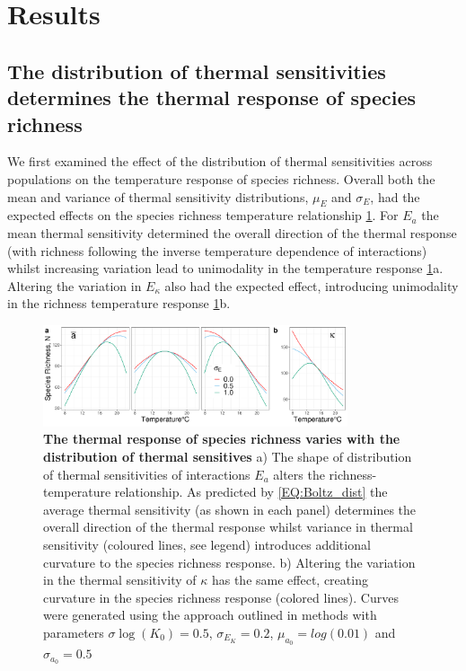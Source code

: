 \documentclass{article}
\begin{document}
\section*{Results}

\subsection*{The distribution of thermal sensitivities determines the thermal response of species richness}

We first examined the effect of the distribution of thermal sensitivities across populations on the temperature response of species richness. Overall both the mean and variance of thermal sensitivity distributions, $\mu_E$ and $\sigma_E$, had the expected effects on the species richness temperature relationship \cref{Fig:N_vs_T}. For $E_a$ the mean thermal sensitivity determined the overall direction of the thermal response (with richness following the inverse temperature dependence of interactions) whilst increasing variation lead to unimodality in the temperature response \cref{Fig:N_vs_T}a. Altering the variation in $E_{\kappa}$ also had the expected effect, introducing unimodality in the richness temperature response \cref{Fig:N_vs_T}b. 

\begin{figure}[h!] 
    \centering
    \includegraphics[width=0.8\textwidth]{docs/Figures/Fig_N_ana.pdf} 
    \caption{\textbf{The thermal response of species richness  varies with the distribution of thermal sensitives} a) The shape of distribution of thermal sensitivities of interactions $E_a$ alters the richness-temperature relationship. As predicted by \cref{EQ:Boltz_dist} the average thermal sensitivity (as shown in each panel) determines the overall direction of the thermal response whilst variance in thermal sensitivity (coloured lines, see legend) introduces additional curvature to the species richness response. b) Altering the variation in the thermal sensitivity of $\kappa$ has the same effect, creating curvature in  the species richness response (colored lines). Curves were generated using the approach outlined in methods with parameters $\sigma{\log(K_0)} = 0.5$, $\sigma_{E_K} = 0.2$, $\mu_{a_0} = log(0.01)$ and  $\sigma_{a_0} = 0.5$}
    \label{Fig:N_vs_T}
\end{figure}
\end{document}
